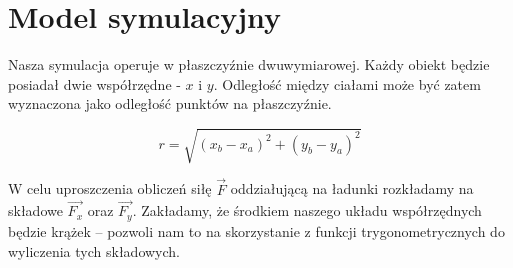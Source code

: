 \documentclass{article}
\begin{document}
\clearpage

\section{Model symulacyjny}

Nasza symulacja operuje w płaszczyźnie dwuwymiarowej. Każdy obiekt będzie posiadał dwie współrzędne - $x$ i $y$. Odległość między ciałami może być zatem wyznaczona jako odległość punktów na płaszczyźnie.

$$
r=\sqrt{\left(x_{b}-x_{a}\right)^{2}+\left(y_{b}-y_{a}\right)^{2}}
$$

\noindent W celu uproszczenia obliczeń siłę $\vec{F}$ oddziałującą na ładunki rozkładamy na składowe $\vec{F_x}$ oraz $\vec{F_y}$. Zakładamy, że środkiem naszego układu współrzędnych będzie krążek -- pozwoli nam to na skorzystanie z funkcji trygonometrycznych do wyliczenia tych składowych.


\end{document}
